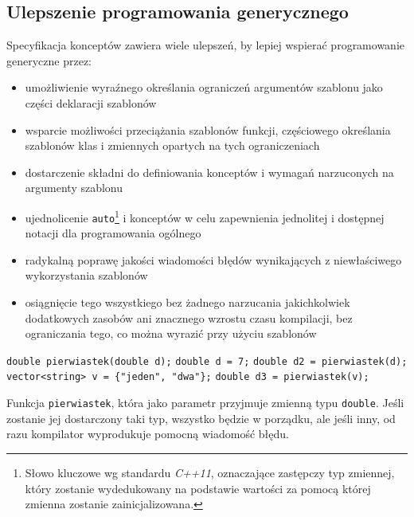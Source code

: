 \documentclass[11pt, a4paper]{article}
\begin{document}
\lstset{language=C++}

\subsection{Ulepszenie programowania generycznego}

Specyfikacja konceptów zawiera wiele ulepszeń, by lepiej wspierać programowanie generyczne przez:
\begin{itemize}

\item umożliwienie wyraźnego określania ograniczeń argumentów szablonu jako części deklaracji szablonów
\item wsparcie możliwości przeciążania szablonów funkcji, częściowego określania szablonów klas i zmiennych opartych na tych ograniczeniach
\item dostarczenie składni do definiowania konceptów i wymagań narzuconych na argumenty szablonu
\item ujednolicenie \verb#auto#\footnote{Słowo kluczowe wg standardu \emph{C++11}, oznaczające zastępczy typ zmiennej, który zostanie wydedukowany na podstawie wartości za pomocą której zmienna zostanie zainicjalizowana.} i konceptów w celu zapewnienia jednolitej i dostępnej notacji dla programowania ogólnego
\item radykalną poprawę jakości wiadomości błędów wynikających z niewłaściwego wykorzystania szablonów
\item osiągnięcie tego wszystkiego bez żadnego narzucania jakichkolwiek dodatkowych zasobów ani znacznego wzrostu czasu kompilacji, bez ograniczania tego, co można wyrazić przy użyciu szablonów

\end{itemize}

\noindent\verb#double pierwiastek(double d);# \newline
\verb#double d = 7;# \newline
\verb#double d2 = pierwiastek(d);# \newline
\verb#vector<string> v = {"jeden", "dwa"};# \newline
\verb#double d3 = pierwiastek(v);# \newline

Funkcja \verb#pierwiastek#, która jako parametr przyjmuje zmienną typu \verb#double#. Jeśli zostanie jej dostarczony taki typ, wszystko będzie w porządku, ale jeśli inny, od razu kompilator wyprodukuje pomocną wiadomość błędu.\newline
\end{document}
